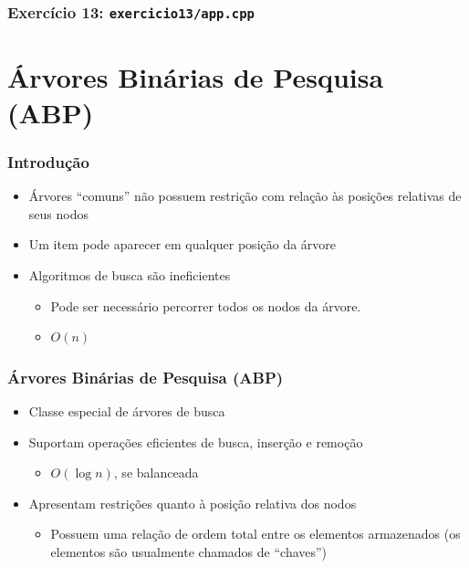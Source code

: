 \documentclass[aspectratio=169]{beamer}
\begin{document}
\begin{frame}[fragile]\frametitle{Exercício 13: \texttt{exercicio13/app.cpp}}
\fontsize{3pt}{5pt}\selectfont{

}
\end{frame}

\section{Árvores Binárias de Pesquisa (ABP)}

\begin{frame}\frametitle{Introdução}
\begin{itemize}
	\item Árvores ``comuns'' não possuem restrição com relação às posições relativas de seus nodos
	\item Um item pode aparecer em qualquer posição da árvore
	\item Algoritmos de busca são ineficientes
	\begin{itemize}
		\item Pode ser necessário percorrer todos os nodos da árvore.
		\item $O(n)$
	\end{itemize}
\end{itemize}
\end{frame}

\begin{frame}\frametitle{Árvores Binárias de Pesquisa (ABP)}
\begin{itemize}
	\item Classe especial de árvores de busca
	\item Suportam operações eficientes de busca, inserção e remoção
	\begin{itemize}
		\item $O(\log{n})$, se balanceada
	\end{itemize}
	\item Apresentam restrições quanto à posição relativa dos nodos
	\begin{itemize}
		\item Possuem uma relação de ordem total entre os elementos armazenados (os elementos são usualmente chamados de ``chaves'')
	\end{itemize}
\end{itemize}
\end{frame}
\end{document}

